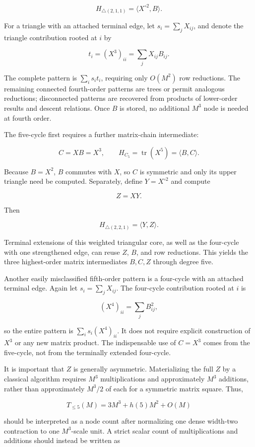 \[
H_{\triangle(2,1,1)}=\langle X^{\circ2},B\rangle.
\]

For a triangle with an attached terminal edge, let \(s_i=\sum_jX_{ij}\), and denote the triangle contribution rooted at \(i\) by

\[
t_i=(X^3)_{ii}=\sum_jX_{ij}B_{ij}.
\]

The complete pattern is \(\sum_i s_it_i\), requiring only \(O(M^2)\) row reductions. The remaining connected fourth-order patterns are trees or permit analogous reductions; disconnected patterns are recovered from products of lower-order results and descent relations. Once \(B\) is stored, no additional \(M^3\) node is needed at fourth order.

The five-cycle first requires a further matrix-chain intermediate:

\[
C=XB=X^3,
\qquad
H_{C_5}=\operatorname{tr}(X^5)=\langle B,C\rangle.
\]

Because \(B=X^2\), \(B\) commutes with \(X\), so \(C\) is symmetric and only its upper triangle need be computed. Separately, define \(Y=X^{\circ2}\) and compute

\[
Z=XY.
\]

Then

\[
H_{\triangle(2,2,1)}=\langle Y,Z\rangle.
\]

Terminal extensions of this weighted triangular core, as well as the four-cycle with one strengthened edge, can reuse \(Z\), \(B\), and row reductions. This yields the three highest-order matrix intermediates \(B,C,Z\) through degree five.

Another easily misclassified fifth-order pattern is a four-cycle with an attached terminal edge. Again let \(s_i=\sum_jX_{ij}\). The four-cycle contribution rooted at \(i\) is

\[
(X^4)_{ii}=\sum_jB_{ij}^2,
\]

so the entire pattern is \(\sum_i s_i(X^4)_{ii}\). It does not require explicit construction of \(X^3\) or any new matrix product. The indispensable use of \(C=X^3\) comes from the five-cycle, not from the terminally extended four-cycle.

It is important that \(Z\) is generally asymmetric. Materializing the full \(Z\) by a classical algorithm requires \(M^3\) multiplications and approximately \(M^3\) additions, rather than approximately \(M^3/2\) of each for a symmetric matrix square. Thus,

\[
T_{\le5}(M)=3M^3+h(5)M^2+O(M)
\]

should be interpreted as a node count after normalizing one dense width-two contraction to one \(M^3\)-scale unit. A strict scalar count of multiplications and additions should instead be written as

